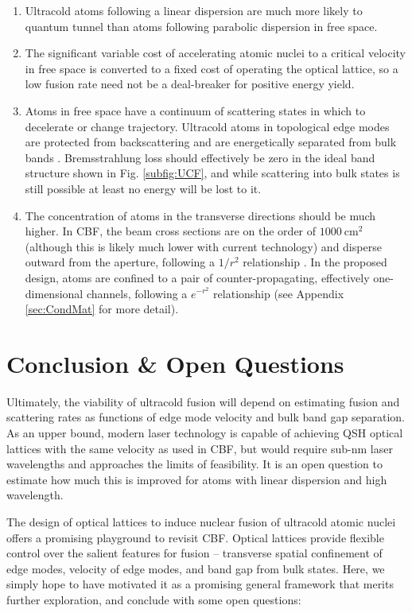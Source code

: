 \documentclass[onecolumn,
               superscriptaddress,
               floatfix,
               longbibliography, 
               showkeys,apl]{revtex4-2}
\begin{document}
\begin{enumerate}
  \item Ultracold atoms following a linear dispersion are much more likely to quantum tunnel than atoms following parabolic dispersion in free space.
  \item The significant variable cost of accelerating atomic nuclei to a critical velocity in free space is converted to a fixed cost of operating the optical lattice, so a low fusion rate need not be a deal-breaker for positive energy yield.
  \item  Atoms in free space have a continuum of scattering states in which to decelerate or change trajectory. Ultracold atoms in topological edge modes are protected from backscattering and are energetically separated from bulk bands \cite{RevModPhys.83.1057}. Bremsstrahlung loss should effectively be zero in the ideal band structure shown in Fig. \ref{subfig:UCF}, and while scattering into bulk states is still possible at least no energy will be lost to it. 
  \item The concentration of atoms in the transverse directions should be much higher. In CBF, the beam cross sections are on the order of $1000~\text{cm}^2$ (although this is likely much lower with current technology) and disperse outward from the aperture, following a $1/r^2$ relationship \cite{blewett197xcbf}. In the proposed design, atoms are confined to a pair of counter-propagating, effectively one-dimensional channels, following a $e^{-r^2}$ relationship (see Appendix \ref{sec:CondMat} for more detail).
\end{enumerate}


\section{Conclusion \& Open Questions}\label{sec:conclusion}

Ultimately, the viability of ultracold fusion will depend on estimating fusion and scattering rates as functions of edge mode velocity and bulk band gap separation. As an upper bound, modern laser technology is capable of achieving QSH optical lattices with the same velocity as used in CBF, but would require sub-nm laser wavelengths and approaches the limits of feasibility. It is an open question to estimate how much this is improved for atoms with linear dispersion and high wavelength.

The design of optical lattices to induce nuclear fusion of ultracold atomic nuclei offers a promising playground to revisit CBF. Optical lattices provide flexible control over the salient features for fusion -- transverse spatial confinement of edge modes, velocity of edge modes, and band gap from bulk states. Here, we simply hope to have motivated it as a promising general framework that merits further exploration, and conclude with some open questions:
\end{document}
